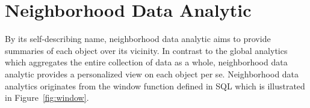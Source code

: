 %
%

\section{Neighborhood Data Analytic}
By its self-describing name, neighborhood data analytic aims to provide
summaries of each object over its vicinity. In contrast to the global
analytics which aggregates the entire collection of data as a whole, neighborhood
data analytic provides a personalized view on each object per se. Neighborhood
data analytics originates from the window function defined in  SQL which is
illustrated in Figure~\ref{fig:window}.

